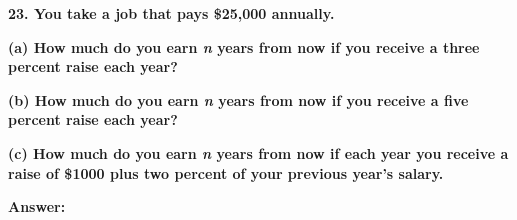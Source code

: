 \documentclass{article}
\begin{document}
\begin{large}
\textbf{23. You take a job that pays \$25,000 annually.}

\textbf{(a) How much do you earn \emph{n} years from now if you receive a three percent raise each year?}

\textbf{(b) How much do you earn \emph{n} years from now if you receive a five percent raise each year? }

\textbf{(c) How much do you earn \emph{n} years from now if each year you receive a raise of \$1000 plus two percent of your previous year's salary.}

\textbf{Answer:} \\








\end{large}
\end{document}
